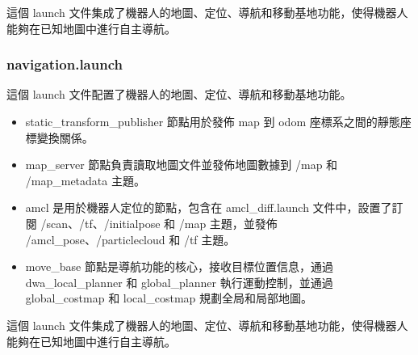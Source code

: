 這個 launch 文件集成了機器人的地圖、定位、導航和移動基地功能，使得機器人能夠在已知地圖中進行自主導航。


\subsubsection{navigation.launch}
這個 launch 文件配置了機器人的地圖、定位、導航和移動基地功能。

\begin{itemize}
    \item static\_transform\_publisher 節點用於發佈 map 到 odom 座標系之間的靜態座標變換關係。
    \item map\_server 節點負責讀取地圖文件並發佈地圖數據到 /map 和 /map\_metadata 主題。
    \item amcl 是用於機器人定位的節點，包含在 amcl\_diff.launch 文件中，設置了訂閱 /scan、/tf、/initialpose 和 /map 主題，並發佈 /amcl\_pose、/particlecloud 和 /tf 主題。
    \item move\_base 節點是導航功能的核心，接收目標位置信息，通過 dwa\_local\_planner 和 global\_planner 執行運動控制，並通過 global\_costmap 和 local\_costmap 規劃全局和局部地圖。
\end{itemize}

這個 launch 文件集成了機器人的地圖、定位、導航和移動基地功能，使得機器人能夠在已知地圖中進行自主導航。









